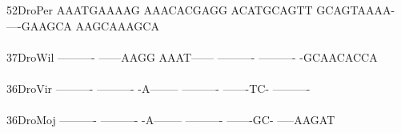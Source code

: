 \documentclass[11pt,twoside,reqno,a4paper]{article}
\begin{document}
{52\hspace*{2\charwidth}DroPer	AAATGAAAAG	AAACACGAGG	ACATGCAGTT	GCAGTAAAA-	----GAAGCA	AAGCAAAGCA	\\
\hspace*{4\charwidth}\hspace*{7\charwidth}\hspace*{1\charwidth}\hspace*{1\charwidth}\hspace*{1\charwidth}\hspace*{1\charwidth}\hspace*{1\charwidth}\hspace*{1\charwidth}\\
37\hspace*{2\charwidth}DroWil	----------	------AAGG	AAAT------	----------	----------	-GCAACACCA	\\
\hspace*{4\charwidth}\hspace*{7\charwidth}\hspace*{1\charwidth}\hspace*{1\charwidth}\hspace*{1\charwidth}\hspace*{1\charwidth}\hspace*{1\charwidth}\hspace*{1\charwidth}\\
36\hspace*{2\charwidth}DroVir	----------	----------	-A--------	----------	-------TC-	----------	\\
\hspace*{4\charwidth}\hspace*{7\charwidth}\hspace*{1\charwidth}\hspace*{1\charwidth}\hspace*{1\charwidth}\hspace*{1\charwidth}\hspace*{1\charwidth}\hspace*{1\charwidth}\\
36\hspace*{2\charwidth}DroMoj	----------	----------	-A--------	----------	-------GC-	-----AAGAT	\\
\hspace*{4\charwidth}\hspace*{7\charwidth}\hspace*{1\charwidth}\hspace*{1\charwidth}\hspace*{1\charwidth}\hspace*{1\charwidth}\hspace*{1\charwidth}\hspace*{1\charwidth}\\
}
\end{document}
